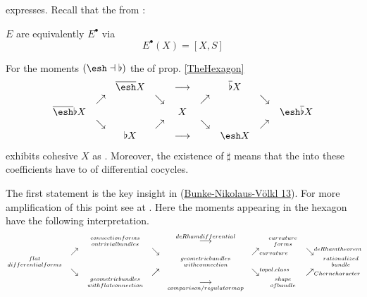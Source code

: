 expresses.
Recall that the  from :
\begin{prop}
\label{}\hypertarget{}{}
 $E$ are equivalently  $E^\bullet$ via
\begin{displaymath}
E^\bullet(X) = [X,S]
\end{displaymath}
\end{prop}
\begin{prop}
\label{DifferentialHexagon}\hypertarget{DifferentialHexagon}{}
For the moments $(\esh  \dashv \flat)$ the  of prop. \ref{TheHexagon}
\begin{displaymath}
\itexarray{
&& \overline{\esh } X && \stackrel{}{\longrightarrow} && \overline{\flat} X
\\
& \nearrow & & \searrow & & \nearrow_{} && \searrow
\\
\overline{\esh } \flat  X  && && X && && \esh  \overline{\flat} X
\\
& \searrow &  & \nearrow & & \searrow && \nearrow_{}
\\
&& \flat X && \longrightarrow && \esh  X
}
\end{displaymath}
exhibits cohesive  $X$ as .
Moreover, the existence of $\sharp$ means that the  into these coefficients have  to  of differential cocycles.
\end{prop}
The first statement is the key insight in (\hyperlink{BunkeNikolausVoelkl13}{Bunke-Nikolaus-Völkl 13}). For more amplification of this point see at .
Here the moments appearing in the hexagon have the following interpretation.
\begin{displaymath}
\itexarray{
&&  {{connectionforms}\atop{ontrivialbundles}} && \stackrel{deRhamdifferential}{\longrightarrow} && {{curvature}\atop{forms}}
\\
& \nearrow & & \searrow & & \nearrow_{\mathrlap{curvature}} && \searrow^{\mathrlap{deRhamtheorem}}
\\
{{flat}\atop{differentialforms}}  &&
&& {{geometricbundles}\atop{withconnection}} && &&
{{rationalized}\atop{bundle}}
\\
& \searrow &  & \nearrow & & \searrow^{\mathrlap{topol.class}} && \nearrow_{\mathrlap{Cherncharacter}}
\\
&& {{geometricbundles}\atop{withflatconnection}} && \underset{comparison/regulatormap}{\longrightarrow} && {{shape}\atop{ofbundle}}
}
\end{displaymath}
